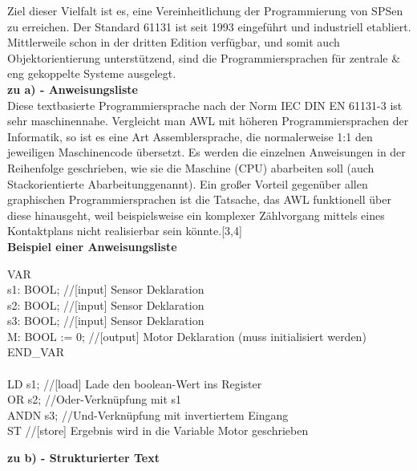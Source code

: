 	Ziel dieser Vielfalt ist es, eine Vereinheitlichung der Programmierung von SPSen zu erreichen. Der Standard 61131 ist seit 1993 eingeführt und industriell etabliert. Mittlerweile schon in der dritten Edition verfügbar, und somit auch Objektorientierung unterstützend, sind die Programmiersprachen für zentrale \& eng gekoppelte Systeme ausgelegt.\\
	
	\textbf{zu a) - Anweisungsliste}\\
	
	Diese textbasierte Programmiersprache nach der Norm IEC DIN EN 61131-3 ist sehr maschinennahe. Vergleicht man AWL mit höheren Programmiersprachen der Informatik, so ist es eine Art Assemblersprache, die normalerweise 1:1 den jeweiligen Maschinencode übersetzt. Es werden die einzelnen Anweisungen in der Reihenfolge geschrieben, wie sie die Maschine (CPU) abarbeiten soll (auch \glqq Stackorientierte Abarbeitung\grqq \space genannt). Ein großer Vorteil gegenüber allen graphischen Programmiersprachen ist die Tatsache, das AWL funktionell über diese hinausgeht, weil beispielsweise ein komplexer Zählvorgang mittels eines Kontaktplans nicht realisierbar sein könnte.[3,4]\\
	
	\textbf{Beispiel einer Anweisungsliste}
	\begin{framed}
	VAR\\
	s1: BOOL; \color{gray}//[input] Sensor Deklaration\\ \color{black}
	s2: BOOL; \color{gray}//[input] Sensor Deklaration\\ \color{black}
	s3: BOOL; \color{gray}//[input] Sensor Deklaration\\ \color{black}
	M: BOOL := 0; \color{gray}//[output] Motor Deklaration (muss initialisiert werden)\\ \color{black}
	END\_VAR\\\\
	LD s1; \color{gray}//[load] Lade den boolean-Wert ins Register\\ \color{black}
	OR s2; \color{gray}//Oder-Verknüpfung mit s1\\ \color{black}
	ANDN s3; \color{gray}//Und-Verknüpfung mit invertiertem Eingang\\ \color{black}
	ST \color{gray}//[store] Ergebnis wird in die Variable Motor geschrieben\\ \color{black}
	\end{framed}
	
	\textbf{zu b) - Strukturierter Text}\\
	
